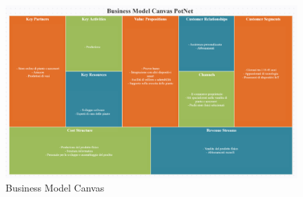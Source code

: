 \begin{figure}[ht!]
	\centering
	\includegraphics[width=\textwidth]{./images/Business-Model-Canvas.PNG} 
	\caption{Business Model Canvas \label{overflow}}
\end{figure}